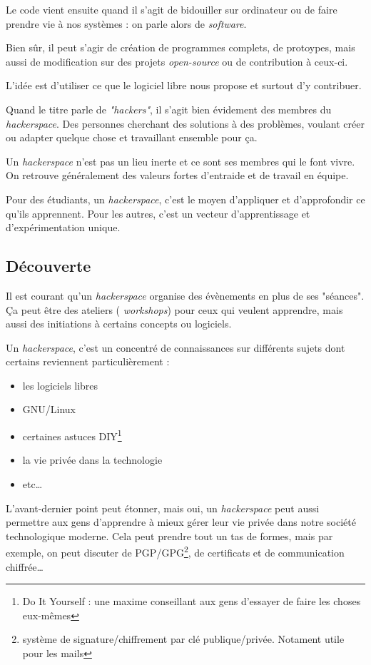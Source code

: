 \documentclass[a4paper, 11pt]{report}
\newcommand{\hs}{{\itshape hackerspace}}
\newcommand{\sw}{{\itshape software}}
\begin{document}
Le code vient ensuite quand il s'agit de bidouiller sur ordinateur ou de faire prendre vie à nos systèmes : on parle
alors de \sw.

Bien sûr, il peut s'agir de création de programmes complets, de protoypes, mais aussi de modification sur des projets
{\itshape open-source} ou de contribution à ceux-ci.

L'idée est d'utiliser ce que le logiciel libre nous propose et surtout d'y contribuer.

\medskip

Quand le titre parle de {\it "hackers"}, il s'agit bien évidement des membres du \hs.
Des personnes cherchant des solutions à des problèmes, voulant créer ou adapter quelque chose et travaillant ensemble
pour ça.

Un \hs{} n'est pas un lieu inerte et ce sont ses membres qui le font vivre. On retrouve généralement des valeurs fortes
d'entraide et de travail en équipe.

Pour des étudiants, un \hs, c'est le moyen d'appliquer et d'approfondir ce qu'ils apprennent.
Pour les autres, c'est un vecteur d'apprentissage et d'expérimentation unique.

    \subsection{Découverte}

    Il est courant qu'un \hs{} organise des évènements en plus de ses "séances". Ça peut être des ateliers ({\it
workshops}) pour ceux qui veulent apprendre, mais aussi des initiations à certains concepts ou logiciels.

Un \hs, c'est un concentré de connaissances sur différents sujets dont certains reviennent particulièrement :

\begin{itemize}
    \item les logiciels libres
    \item GNU/Linux
    \item certaines astuces DIY\footnote{Do It Yourself : une maxime conseillant aux gens d'essayer de faire les choses
    eux-mêmes}
    \item la vie privée dans la technologie
    \item etc\ldots
\end{itemize}

L'avant-dernier point peut étonner, mais oui, un \hs{} peut aussi permettre aux gens d'apprendre à mieux gérer leur vie
privée dans notre société technologique moderne. Cela peut prendre tout un tas de formes, mais par exemple, on peut
discuter de PGP/GPG\footnote{système de signature/chiffrement par clé publique/privée. Notament utile pour les mails},
de certificats et de communication chiffrée\ldots
\end{document}
